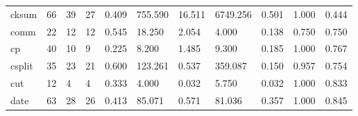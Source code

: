 \begin{longtable}{lp{1.2cm}p{1.2cm}p{1.2cm}p{1.2cm}p{1.2cm}p{1.2cm}p{1.2cm}p{1.2cm}p{1.2cm}p{1.2cm}}
cksum     &                           66 &                 39 &                                27 &                                      0.409 &                                755.590 &                                       16.511 &                          6749.256 &                                   0.501 &                              1.000 &                                              0.444 \\
comm      &                           22 &                 12 &                                12 &                                      0.545 &                                 18.250 &                                        2.054 &                             4.000 &                                   0.138 &                              0.750 &                                              0.750 \\
cp        &                           40 &                 10 &                                 9 &                                      0.225 &                                  8.200 &                                        1.485 &                             9.300 &                                   0.185 &                              1.000 &                                              0.767 \\
csplit    &                           35 &                 23 &                                21 &                                      0.600 &                                123.261 &                                        0.537 &                           359.087 &                                   0.150 &                              0.957 &                                              0.754 \\
cut       &                           12 &                  4 &                                 4 &                                      0.333 &                                  4.000 &                                        0.032 &                             5.750 &                                   0.032 &                              1.000 &                                              0.833 \\
date      &                           63 &                 28 &                                26 &                                      0.413 &                                 85.071 &                                        0.571 &                            81.036 &                                   0.357 &                              1.000 &                                              0.845 \\

\end{longtable}
